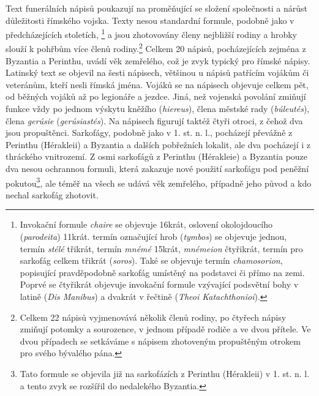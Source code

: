 Text funerálních nápisů poukazují na proměňující se složení společnosti a nárůst důležitosti římského vojska. Texty nesou standardní formule, podobně jako v předcházejících stoletích, \footnote{Invokační formule {\em chaire} se objevuje 16krát, oslovení okolojdoucího ({\em parodeita}) 11krát. termín označující hrob ({\em tymbos}) se objevuje jednou, termín {\em stélé} třikrát, termín {\em mnémé} 15krát, {\em mnémeion} čtyřikrát, termín pro sarkofág celkem třikrát ({\em soros}). Také se objevuje termín {\em chamosorion}, popisující pravděpodobně sarkofág umístěný na podstavci či přímo na zemi. Poprvé se čtyřikrát objevuje invokační formule vzývající podsvětní bohy v latině ({\em Dis Manibus}) a dvakrát v řečtině ({\em Theoi Katachthonioi}).} a jsou zhotovovány členy nejbližší rodiny a hrobky slouží k pohřbům více členů rodiny.\footnote{Celkem 22 nápisů vyjmenovává několik členů rodiny, po čtyřech nápisy zmiňují potomky a sourozence, v jednom případě rodiče a ve dvou přítele. Ve dvou případech se setkáváme s nápisem zhotoveným propuštěným otrokem pro svého bývalého pána.} Celkem 20 nápisů, pocházejících zejména z Byzantia a Perinthu, uvádí věk zemřelého, což je zvyk typický pro římské nápisy. Latinský text se objevil na šesti nápisech, většinou u nápisů patřícím vojákům či veteránům, kteří nesli římská jména. Vojáků se na nápisech objevuje celkem pět, od běžných vojáků až po legionáře a jezdce. Jiná, než vojenská povolání zmiňují funkce vždy po jednom výskytu kněžího ({\em hiereus}), člena městské rady ({\em búleutés}), člena {\em gerúsie} ({\em gerúsiastés}). Na nápisech figurují taktéž čtyři otroci, z čehož dva jsou propuštěnci. Sarkofágy, podobně jako v 1. st. n. l., pocházejí převážně z Perinthu (Hérakleii) a Byzantia a dalších pobřežních lokalit, ale dva pocházejí i z thráckého vnitrozemí. Z osmi sarkofágů z Perinthu (Hérakleie) a Byzantia pouze dva nesou ochrannou formuli, která zakazuje nové použití sarkofágu pod peněžní pokutou\footnote{Tato formule se objevila již na sarkofázích z Perinthu (Hérakleii) v 1. st. n. l. a tento zvyk se rozšířil do nedalekého Byzantia.}, ale téměř na všech se udává věk zemřelého, případně jeho původ a kdo nechal sarkofág zhotovit.

